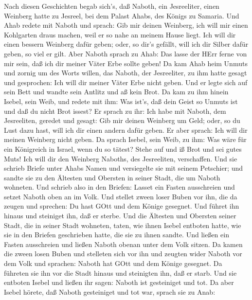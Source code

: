  Nach diesen Geschichten begab sich's, daß Naboth, ein
Jesreeliter, einen Weinberg hatte zu Jesreel, bei dem Palast Ahabs, des
Königs zu Samaria.  Und Ahab redete mit Naboth und sprach:
Gib mir deinen Weinberg, ich will mir einen Kohlgarten draus machen,
weil er so nahe an meinem Hause liegt. Ich will dir einen bessern
Weinberg dafür geben; oder, so dir's gefällt, will ich dir Silber dafür
geben, so viel er gilt.  Aber Naboth sprach zu Ahab: Das
lasse der HErr ferne von mir sein, daß ich dir meiner Väter Erbe sollte
geben!  Da kam Ahab heim Unmuts und zornig um des Worts
willen, das Naboth, der Jesreeliter, zu ihm hatte gesagt und gesprochen:
Ich will dir meiner Väter Erbe nicht geben. Und er legte sich auf sein
Bett und wandte sein Antlitz und aß kein Brot.  Da kam zu
ihm hinein Isebel, sein Weib, und redete mit ihm: Was ist's, daß dein
Geist so Unmuts ist und daß du nicht Brot issest?  Er sprach
zu ihr: Ich habe mit Naboth, dem Jesreeliten, geredet und gesagt: Gib
mir deinen Weinberg um Geld; oder, so du Lust dazu hast, will ich dir
einen andern dafür geben. Er aber sprach: Ich will dir meinen Weinberg
nicht geben.  Da sprach Isebel, sein Weib, zu ihm: Was wäre
für ein Königreich in Israel, wenn du so tätest? Stehe auf und iß Brot
und sei gutes Muts! Ich will dir den Weinberg Naboths, des Jesreeliten,
verschaffen.  Und sie schrieb Briefe unter Ahabs Namen und
versiegelte sie mit seinem Petschier; und sandte sie zu den Ältesten und
Obersten in seiner Stadt, die um Naboth wohneten.  Und
schrieb also in den Briefen: Lasset ein Fasten ausschreien und setzet
Naboth oben an im Volk.  Und stellet zween loser Buben vor
ihn, die da zeugen und sprechen: Du hast GOtt und dem Könige gesegnet.
Und führet ihn hinaus und steiniget ihn, daß er sterbe. 
Und die Ältesten und Obersten seiner Stadt, die in seiner Stadt
wohneten, taten, wie ihnen Isebel entboten hatte, wie sie in den Briefen
geschrieben hatte, die sie zu ihnen sandte.  Und ließen ein
Fasten ausschreien und ließen Naboth obenan unter dem Volk sitzen.
 Da kamen die zween losen Buben und stelleten sich vor ihn
und zeugten wider Naboth vor dem Volk und sprachen: Naboth hat GOtt und
dem Könige gesegnet. Da führeten sie ihn vor die Stadt hinaus und
steinigten ihn, daß er starb.  Und sie entboten Isebel und
ließen ihr sagen: Naboth ist gesteiniget und tot.  Da aber
Isebel hörete, daß Naboth gesteiniget und tot war, sprach sie zu Anab:
